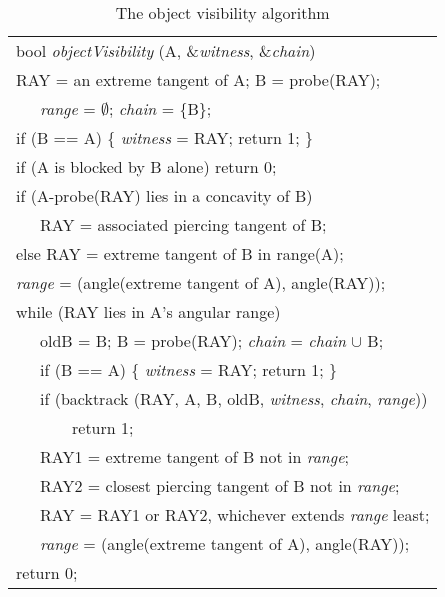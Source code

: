 \documentclass[10pt,twocolumn]{article}
\newif\ifJournal
\begin{document}
\begin{table}[h]
\caption{The object visibility algorithm}
\label{table:objvis}
\vspace{.2in}
\begin{tabular}{|l|} \hline
bool {\em objectVisibility} (A, \&{\em witness}, \&{\em chain}) \\[1em]

RAY = an extreme tangent of A; B = probe(RAY);\\
\ \ \ {\em range} = $\emptyset$; {\em chain} = \{B\};\\
%
if (B == A) \{ {\em witness} = RAY; return 1; \}\\
if (A is blocked by B alone) return 0;\\
if (A-probe(RAY) lies in a concavity of B)\\
\ \ \ RAY = associated piercing tangent of B;\\
else RAY = extreme tangent of B in range(A);\\
{\em range}    = (angle(extreme tangent of A), angle(RAY));\\

while (RAY lies in A's angular range)\\
\ \ \ oldB = B;  B = probe(RAY); {\em chain} = {\em chain} $\cup$ B;\\
\ \ \ if (B == A) \{ {\em witness} = RAY; return 1; \}\\
\ \ \ if (backtrack (RAY, A, B, oldB, {\em witness}, {\em chain}, {\em range}))\\
\ \ \ \ \ \ \ return 1;\\
\ \ \ RAY1 = extreme tangent of B not in {\em range};\\
\ \ \ RAY2 = closest piercing tangent of B not in {\em range};\\
\ \ \ RAY = RAY1 or RAY2, whichever extends {\em range} least;\\
\ \ \ {\em range} = (angle(extreme tangent of A), angle(RAY));\\
return 0;\\
\hline
\end{tabular}
\end{table}
\end{document}
